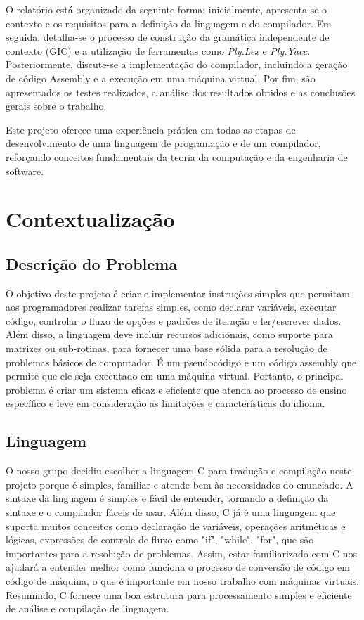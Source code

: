 \documentclass[12pt,a4paper]{report}
\begin{document}
O relatório está organizado da seguinte forma: inicialmente, apresenta-se o contexto e os requisitos para a definição da linguagem e do compilador. Em seguida, detalha-se o processo de construção da gramática independente de contexto (GIC) e a utilização de ferramentas como \emph{Ply.Lex} e \emph{Ply.Yacc}. Posteriormente, discute-se a implementação do compilador, incluindo a geração de código Assembly e a execução em uma máquina virtual. Por fim, são apresentados os testes realizados, a análise dos resultados obtidos e as conclusões gerais sobre o trabalho.

Este projeto oferece uma experiência prática em todas as etapas de desenvolvimento de uma linguagem de programação e de um compilador, reforçando conceitos fundamentais da teoria da computação e da engenharia de software.

\chapter{Contextualiza\c{c}\~{a}o}
\section{Descri\c{c}\~{a}o do Problema}
O objetivo deste projeto é criar e implementar instruções simples que permitam aos programadores realizar tarefas simples, como declarar variáveis, executar código, controlar o fluxo de opções e padrões de iteração e ler/escrever dados. Além disso, a linguagem deve incluir recursos adicionais, como suporte para matrizes ou sub-rotinas, para fornecer uma base sólida para a resolução de problemas básicos de computador. É um pseudocódigo e um código assembly que permite que ele seja executado em uma máquina virtual. Portanto, o principal problema é criar um sistema eficaz e eficiente que atenda ao processo de ensino específico e leve em consideração as limitações e características do idioma.
\section{Linguagem}
O nosso grupo decidiu escolher a linguagem C para tradução e compilação neste projeto porque é simples, familiar e atende bem às necessidades do enunciado. A sintaxe da linguagem é simples e fácil de entender, tornando a definição da sintaxe e o compilador fáceis de usar. Além disso, C já é uma linguagem que suporta muitos conceitos como declaração de variáveis, operações aritméticas e lógicas, expressões de controle de fluxo como "if", "while", "for", que são importantes para a resolução de problemas. Assim, estar familiarizado com C nos ajudará a entender melhor como funciona o processo de conversão de código em código de máquina, o que é importante em nosso trabalho com máquinas virtuais. Resumindo, C fornece uma boa estrutura para processamento simples e eficiente de análise e compilação de linguagem.
\end{document}
